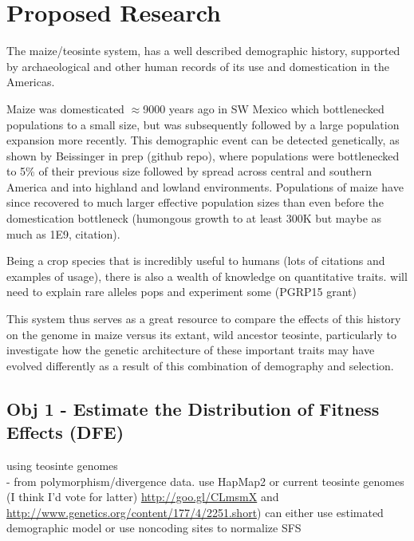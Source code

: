 \documentclass[10pt, letterpaper]{article}
\newcommand{\kjg}[1]{\todo[size=\scriptsize, color=blue]{#1}}
\begin{document}
\section*{Proposed Research}
	
The maize/teosinte system, has a well described demographic history, supported by archaeological and other human records of its use and domestication in the Americas.

Maize was domesticated $\approx$9000 years ago in SW Mexico which bottlenecked populations to a small size, but was subsequently followed by a large population expansion more recently. This demographic event can be detected genetically, as shown by Beissinger in prep (github repo), where populations were bottlenecked to 5\% of their previous size followed by spread across central and southern America and into highland and lowland environments. Populations of maize have since recovered to much larger effective population sizes than even before the domestication bottleneck (humongous growth to at least 300K but maybe as much as 1E9, citation).

Being a crop species that is incredibly useful to humans (lots of citations and examples of usage), there is also a wealth of knowledge on quantitative traits. 
will need to explain rare alleles pops and experiment some (PGRP15 grant)

This system thus serves as a great resource to compare the effects of this history on the genome in maize versus its extant, wild ancestor teosinte, particularly to investigate how the genetic architecture of these important traits may have evolved differently as a result of this combination of demography and selection.


\subsection{Obj 1 - Estimate the Distribution of Fitness Effects (DFE)}

	using teosinte genomes \kjg{note to self, update the data description}\\
		- from polymorphism/divergence data. use HapMap2 or current teosinte genomes (I think I'd vote for latter)
		\url{http://goo.gl/CLmsmX} and \url{http://www.genetics.org/content/177/4/2251.short})
		can either use estimated demographic model or use noncoding sites to normalize SFS
		
\end{document}
